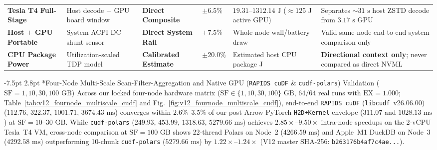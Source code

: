 \documentclass[10pt,a4paper]{article}
\makeatletter
\renewcommand\subsection{\@startsection{subsection}{2}{\z@}%
  {-7.5pt \@plus -2pt \@minus -1pt}%
  {2.8pt \@plus 1pt}%
  {\normalfont\normalsize\bfseries}}
\makeatother
\begin{document}
\begin{table}[htbp]
{\begin{tabular}{@{}llllll@{}}
\textbf{Tesla T4 Full-Stage} & Host decode $+$ GPU board window & \textbf{Direct Composite} & $\pm 6.5\%$ & $19.31\text{--}1312.14\text{ J}$ ($\approx 125\text{ J}$ active GPU) & Separates $\sim 31\text{ s}$ host ZSTD decode from $3.17\text{ s}$ GPU \\
\textbf{Host $+$ GPU Portable} & System ACPI DC shunt sensor & \textbf{Direct System Rail} & $\pm 7.5\%$ & Whole-node wall/battery draw & Valid same-node end-to-end system comparison only \\
\textbf{CPU Package Power} & Utilization-scaled TDP model & \textbf{Calibrated Estimate} & $\pm 20.0\%$ & Estimated host CPU package J & \textbf{Directional context only}; never compared as direct NVML \\
\bottomrule
\end{tabular}%
}
\end{table}

\subsection*{Four-Node Multi-Scale Scan-Filter-Aggregation and Native GPU (\texttt{RAPIDS cuDF} \& \texttt{cudf-polars}) Validation ($\text{SF}=1, 10, 30, 100\text{ GB}$)}
Across our locked four-node hardware matrix ($\text{SF} \in \{1, 10, 30, 100\}\text{ GB}$, $64/64$ real runs with $\text{EX}=1.000$; Table~\ref{tab:v12_fournode_multiscale_cudf} and Fig.~\ref{fig:v12_fournode_multiscale_cudf}), end-to-end \texttt{RAPIDS cuDF} (\texttt{libcudf}~v26.06.00)~\cite{rapids2024cudf} ($112.76$, $322.37$, $1001.71$, $3674.43\text{ ms}$) converges within $2.6\%\text{--}3.5\%$ of our post-Arrow PyTorch \texttt{H2D+Kernel} envelope ($311.07$ and $1028.13\text{ ms}$) at $\text{SF}=10\text{--}30\text{ GB}$. While \texttt{cudf-polars} ($249.93$, $453.99$, $1318.63$, $5279.66\text{ ms}$) achieves $2.85\times\text{--}9.50\times$ intra-node speedups on the 2-vCPU Tesla~T4 VM, cross-node comparison at $\text{SF}=100\text{ GB}$ shows 22-thread Polars on Node~2 ($4266.59\text{ ms}$) and Apple~M1 DuckDB on Node~3 ($4292.58\text{ ms}$) outperforming 10-chunk \texttt{cudf-polars} ($5279.66\text{ ms}$) by $1.22\times\text{--}1.24\times$ (V12 master SHA-256: \texttt{b263176b4af7c4ae...}).
\end{document}
